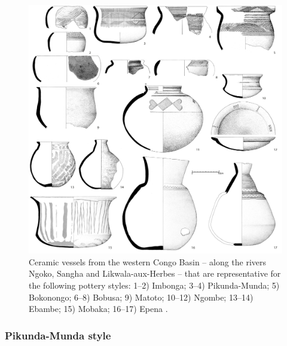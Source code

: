 \documentclass[smallextended,natbib]{svjour3}       %
\begin{document}
\begin{figure}[!tb]
	\includegraphics[width=\textwidth]{Sangha_Typen.pdf}
	\caption{Ceramic vessels from the western Congo Basin -- along the rivers Ngoko, Sangha and Likwala-aux-Herbes -- that are representative for the following pottery styles: 1--2) Imbonga; 3--4) Pikunda-Munda; 5) Bokonongo; 6--8) Bobusa; 9) Matoto; 10--12) Ngombe; 13--14) Ebambe; 15) Mobaka; 16--17) Epena \citep[114--144, 162--172]{Seidensticker.2021e}.}
	\label{fig:sangha}
\end{figure}

\subsubsection*{Pikunda-Munda style}
\end{document}
